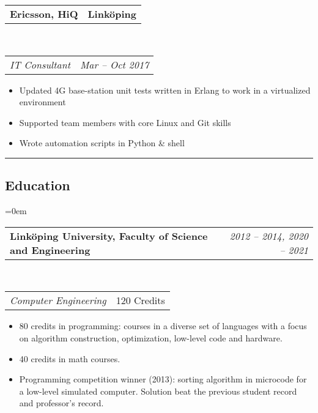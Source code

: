 \documentclass[10pt,letterpaper]{article}
\makeatletter
\newcommand{\headerrow}[2]
{\begin{tabular*}{\linewidth}{l@{\extracolsep{\fill}}r}
	#1 &
	#2 \\
\end{tabular*}}
\makeatother
\begin{document}
\headerrow
{\textbf{Ericsson, HiQ}}
{\textbf{Linköping}}
\\
\headerrow
{\emph{IT Consultant}}
{\emph{Mar -- Oct 2017}}
\begin{itemize}[noitemsep, topsep=0pt]
    \item Updated 4G base-station unit tests written in
        Erlang to work in a virtualized environment
    \item Supported team members with core Linux and Git skills
    \item Wrote automation scripts in Python \& shell
\end{itemize}
\vspace{0.5em}



\hrule
\vspace{-0.4em}
\subsection*{Education}
\parindent=0em

\headerrow
    {\textbf{Linköping University, Faculty of Science and Engineering}}
    {\emph{2012 -- 2014, 2020 -- 2021}}
\\
\headerrow
    {\emph{Computer Engineering}}
    {120 Credits}
\begin{itemize}[noitemsep, topsep=0pt]
    \item 80 credits in programming: courses in a diverse set of languages with
        a focus on algorithm construction, optimization, low-level code and
        hardware.
    \item 40 credits in math courses.
    \item Programming competition winner (2013): sorting algorithm in microcode
        for a low-level simulated computer. Solution beat the previous student
        record and professor's record.
\end{itemize}
\vspace{0.5em}
\end{document}
